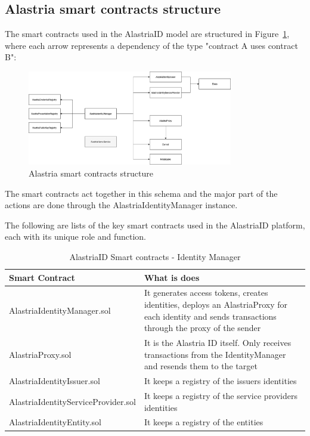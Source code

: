 \documentclass[target=mst,aauheader=]{thud}
\begin{document}
\subsection{Alastria smart contracts structure}

The smart contracts used in the AlastriaID model are structured in Figure~\ref{fig:alastriaSCStructure}, where each arrow represents a dependency of the type "contract A uses contract B":

\begin{figure}
    \centering
    \includegraphics[width=0.8\textwidth]{images/alastriaSmartContractsStructure.png}
    \caption{Alastria smart contracts structure}
    \label{fig:alastriaSCStructure}
\end{figure}

The smart contracts act together in this schema and the major part of the actions are done through the AlastriaIdentityManager instance.\par
The following are lists of the key smart contracts used in the AlastriaID platform, each with its unique role and function.

\begin{table}[h!]
    \begin{tabular}{|p{6cm}|p{12cm}|}
    \hline
    Smart Contract & What is does\\ [0.5ex] 
    \hline\hline
    AlastriaIdentityManager.sol	 & It generates access tokens, creates identities, deploys an AlastriaProxy for each identity and sends transactions through the proxy of the sender\\ 
    \hline
    AlastriaProxy.sol & It is the Alastria ID itself. Only receives transactions from the IdentityManager and resends them to the target \\ 
    \hline
    AlastriaIdentityIssuer.sol & It keeps a registry of the issuers identities \\
    \hline
    AlastriaIdentityServiceProvider.sol & It keeps a registry of the service providers identities \\
    \hline
    AlastriaIdentityEntity.sol & It keeps a registry of the entities \\
    \hline
    \end{tabular}
    \caption{AlastriaID Smart contracts - Identity Manager}

\end{table}
\end{document}
